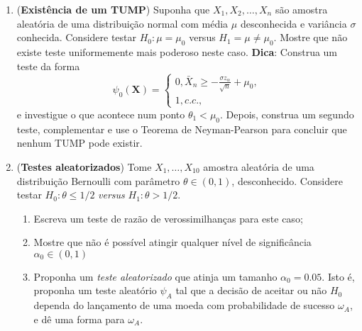 \documentclass[a4paper,10pt, notitlepage]{report}
\newcommand{\rs}{X_1, X_2, \ldots, X_n} %
\newcommand{\bX}{\boldsymbol{X}} %
\begin{document}
\begin{enumerate} 
\item (\textbf{Existência de um TUMP}) Suponha que $\rs$ são amostra aleatória de uma distribuição normal com média $\mu$ desconhecida e variância $\sigma$ conhecida.
Considere testar $H_0: \mu = \mu_0$ versus $H_1 = \mu \neq \mu_0$. 
Mostre que não existe teste uniformemente mais poderoso neste caso.
\textbf{Dica}: Construa um teste da forma
\begin{equation*}
    \psi_0(\bX) = \begin{cases}
    0, \bar{X}_n \geq - \frac{\sigma z_\alpha}{\sqrt{n}} + \mu_0,\\
    1, c.c.,
    \end{cases}
\end{equation*}
e investigue o que acontece num ponto $\theta_1 < \mu_0$. 
Depois, construa um segundo teste, complementar e use o Teorema de Neyman-Pearson para concluir que nenhum TUMP pode existir.
\item (\textbf{Testes aleatorizados}) Tome $X_1, \ldots, X_{10}$ amostra aleatória de uma distribuição Bernoulli com parâmetro $\theta \in (0, 1)$, desconhecido.
Considere testar $H_0: \theta \leq 1/2$ \textit{versus} $H_1: \theta > 1/2$.
\begin{enumerate}
    \item  Escreva um teste de razão de verossimilhanças para este caso;
    \item  Mostre que não é possível atingir qualquer nível de significância $\alpha_0 \in (0, 1)$
    \item Proponha um \textit{teste aleatorizado} que atinja um tamanho $\alpha_0 = 0.05$.
    Isto é, proponha um teste aleatório $\psi_A$ tal que a decisão de aceitar ou não $H_0$ dependa do lançamento de uma moeda com probabilidade de sucesso $\omega_A$, e dê uma forma para $\omega_A$.
\end{enumerate}
\end{enumerate}
% 
% 
\end{document}
